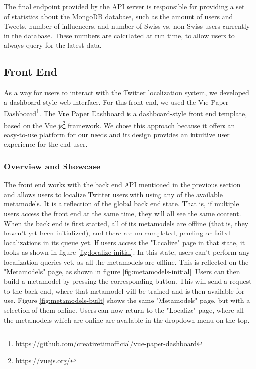 \documentclass[10pt,a4paper]{article}
\begin{document}
The final endpoint provided by the API server is responsible for providing a set of statistics about the MongoDB database, such as the amount of users and Tweets, number of influencers, and number of Swiss vs. non-Swiss users currently in the database. These numbers are calculated at run time, to allow users to always query for the latest data. 

\subsection{Front End}
As a way for users to interact with the Twitter localization system, we developed a dashboard-style web interface. For this front end, we used the Vie Paper Dashboard\footnote{\href{https://github.com/creativetimofficial/vue-paper-dashboard}{https://github.com/creativetimofficial/vue-paper-dashboard}}. The Vue Paper Dashboard is a dashboard-style front end template, based on the Vue.js\footnote{\href{https://vuejs.org/}{https://vuejs.org/}} framework. We chose this approach because it offers an easy-to-use platform for our needs and its design provides an intuitive user experience for the end user.

\subsubsection{Overview and Showcase}
The front end works with the back end API mentioned in the previous section and allows users to localize Twitter users with using any of the available metamodels. It is a reflection of the global back end state. That is, if multiple users access the front end at the same time, they will all see the same content. When the back end is first started, all of its metamodels are offline (that is, they haven't yet been initialized), and there are no completed, pending or failed localizations in its queue yet. If users access the "Localize" page in that state, it looks as shown in figure \ref{fig:localize-initial}. In this state, users can't perform any localization queries yet, as all the metamodels are offline. This is reflected on the "Metamodels" page, as shown in figure \ref{fig:metamodels-initial}. Users can then build a metamodel by pressing the corresponding button. This will send a request to the back end, where that metamodel will be trained and is then available for use. Figure \ref{fig:metamodels-built} shows the same "Metamodels" page, but with a selection of them online. Users can now return to the "Localize" page, where all the metamodels which are online are available in the dropdown menu on the top. 
\end{document}
